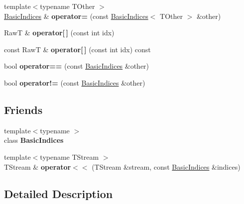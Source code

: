 \begin{DoxyCompactItemize}
\item 
\hypertarget{classBasicIndices_a97d894fe77b1a4f7c3013c776493afee}{}\label{classBasicIndices_a97d894fe77b1a4f7c3013c776493afee} 
{\footnotesize template$<$typename T\+Other $>$ }\\\hyperlink{classBasicIndices}{Basic\+Indices} \& {\bfseries operator=} (const \hyperlink{classBasicIndices}{Basic\+Indices}$<$ T\+Other $>$ \&other)
\item 
\hypertarget{classBasicIndices_a55d907b78f920f2efef89ec3bff9f049}{}\label{classBasicIndices_a55d907b78f920f2efef89ec3bff9f049} 
RawT \& {\bfseries operator\mbox{[}$\,$\mbox{]}} (const int idx)
\item 
\hypertarget{classBasicIndices_a9c2765925b94da3113252c1ed635a403}{}\label{classBasicIndices_a9c2765925b94da3113252c1ed635a403} 
const RawT \& {\bfseries operator\mbox{[}$\,$\mbox{]}} (const int idx) const
\item 
\hypertarget{classBasicIndices_ac9efe24f22d605f8367f8117b4f858cf}{}\label{classBasicIndices_ac9efe24f22d605f8367f8117b4f858cf} 
bool {\bfseries operator==} (const \hyperlink{classBasicIndices}{Basic\+Indices} \&other)
\item 
\hypertarget{classBasicIndices_af1f37a4b1783447d0e38a5f24ed03285}{}\label{classBasicIndices_af1f37a4b1783447d0e38a5f24ed03285} 
bool {\bfseries operator!=} (const \hyperlink{classBasicIndices}{Basic\+Indices} \&other)
\end{DoxyCompactItemize}
\subsection*{Friends}
\begin{DoxyCompactItemize}
\item 
\hypertarget{classBasicIndices_a55d7587dc9fcfcc78c838f1401417738}{}\label{classBasicIndices_a55d7587dc9fcfcc78c838f1401417738} 
{\footnotesize template$<$typename $>$ }\\class {\bfseries Basic\+Indices}
\item 
\hypertarget{classBasicIndices_a4bfdb985aa6c2005116deaa410c26a98}{}\label{classBasicIndices_a4bfdb985aa6c2005116deaa410c26a98} 
{\footnotesize template$<$typename T\+Stream $>$ }\\T\+Stream \& {\bfseries operator$<$$<$} (T\+Stream \&stream, const \hyperlink{classBasicIndices}{Basic\+Indices} \&indices)
\end{DoxyCompactItemize}


\subsection{Detailed Description}
